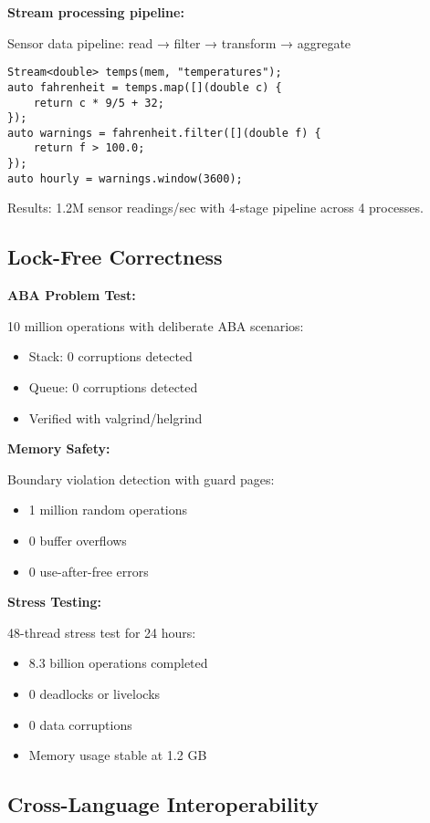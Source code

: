 \documentclass[letterpaper,twocolumn,10pt]{article}
\begin{document}
\textbf{Stream processing pipeline:}

Sensor data pipeline: read → filter → transform → aggregate

\begin{lstlisting}
Stream<double> temps(mem, "temperatures");
auto fahrenheit = temps.map([](double c) { 
    return c * 9/5 + 32; 
});
auto warnings = fahrenheit.filter([](double f) { 
    return f > 100.0; 
});
auto hourly = warnings.window(3600);
\end{lstlisting}

Results: 1.2M sensor readings/sec with 4-stage pipeline across 4 processes.

\subsection{Lock-Free Correctness}

\textbf{ABA Problem Test:}

10 million operations with deliberate ABA scenarios:
\begin{itemize}
\item Stack: 0 corruptions detected
\item Queue: 0 corruptions detected
\item Verified with valgrind/helgrind
\end{itemize}

\textbf{Memory Safety:}

Boundary violation detection with guard pages:
\begin{itemize}
\item 1 million random operations
\item 0 buffer overflows
\item 0 use-after-free errors
\end{itemize}

\textbf{Stress Testing:}

48-thread stress test for 24 hours:
\begin{itemize}
\item 8.3 billion operations completed
\item 0 deadlocks or livelocks
\item 0 data corruptions
\item Memory usage stable at 1.2 GB
\end{itemize}

\subsection{Cross-Language Interoperability}
\end{document}
